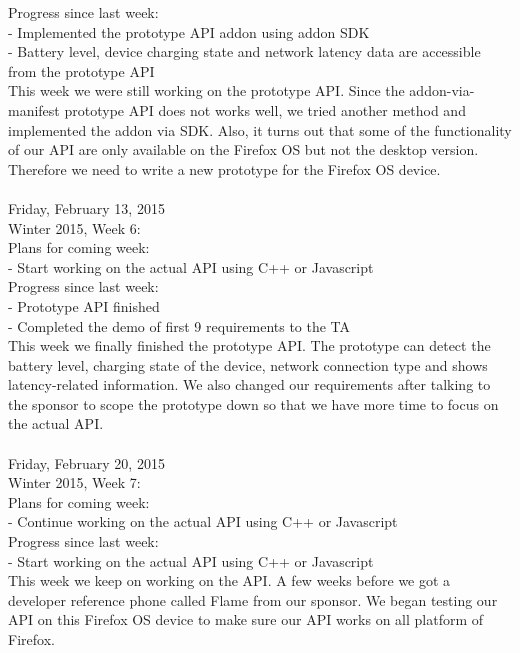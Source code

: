 {Progress since last week: \\
- Implemented the prototype API addon using addon SDK \\
- Battery level, device charging state and network latency data are accessible from the prototype API \\

This week we were still working on the prototype API. Since the addon-via-manifest prototype API does not works well, we tried another method and implemented the addon via SDK. Also, it turns out that some of the functionality of our API are only available on the Firefox OS but not the desktop version. Therefore we need to write a new prototype for the Firefox OS device. \\

\hrulefill \\
Friday, February 13, 2015 \\
Winter 2015, Week 6: \\

Plans for coming week: \\
- Start working on the actual API using C++ or Javascript \\

Progress since last week: \\
- Prototype API finished \\
- Completed the demo of first 9 requirements to the TA \\

This week we finally finished the prototype API. The prototype can detect the battery level, charging state of the device, network connection type and shows latency-related information. We also changed our requirements after talking to the sponsor to scope the prototype down so that we have more time to focus on the actual API. \\

\hrulefill \\
Friday, February 20, 2015 \\
Winter 2015, Week 7: \\

Plans for coming week: \\
- Continue working on the actual API using C++ or Javascript \\

Progress since last week: \\
- Start working on the actual API using C++ or Javascript \\

This week we keep on working on the API. A few weeks before we got a developer reference phone called Flame from our sponsor. We began testing our API on this Firefox OS device to make sure our API works on all platform of Firefox. \\

}
